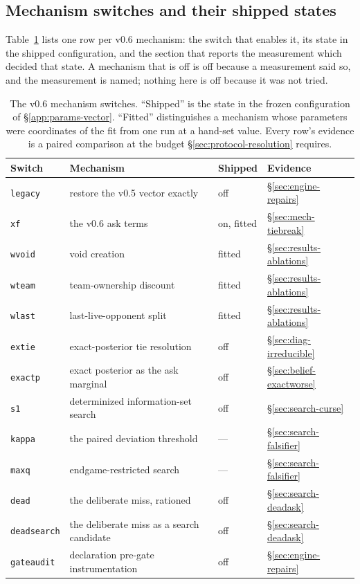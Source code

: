 \subsection{Mechanism switches and their shipped states}
\label{app:params-switches}

Table~\ref{tab:switches} lists one row per v0.6 mechanism: the switch that
enables it, its state in the shipped configuration, and the section that reports
the measurement which decided that state. A mechanism that is off is off because
a measurement said so, and the measurement is named; nothing here is off because
it was not tried.

\begin{table}[ht]
\centering
\caption{The v0.6 mechanism switches. ``Shipped'' is the state in the frozen
configuration of \S\ref{app:params-vector}. ``Fitted'' distinguishes a mechanism
whose parameters were coordinates of the fit from one run at a hand-set value.
Every row's evidence is a paired comparison at the budget
\S\ref{sec:protocol-resolution} requires.}
\label{tab:switches}
\small
\begin{tabular}{llll}
\toprule
Switch & Mechanism & Shipped & Evidence \\
\midrule
\texttt{legacy} & restore the v0.5 vector exactly & off & \S\ref{sec:engine-repairs} \\
\texttt{xf} & the \numVsixAskTerms{} v0.6 ask terms & on, fitted & \S\ref{sec:mech-tiebreak} \\
\texttt{wvoid} & void creation & fitted & \S\ref{sec:results-ablations} \\
\texttt{wteam} & team-ownership discount & fitted & \S\ref{sec:results-ablations} \\
\texttt{wlast} & last-live-opponent split & fitted & \S\ref{sec:results-ablations} \\
\texttt{extie} & exact-posterior tie resolution & off & \S\ref{sec:diag-irreducible} \\
\texttt{exactp} & exact posterior as the ask marginal & off & \S\ref{sec:belief-exactworse} \\
\texttt{s1} & determinized information-set search & off & \S\ref{sec:search-curse} \\
\texttt{kappa} & the paired deviation threshold & --- & \S\ref{sec:search-falsifier} \\
\texttt{maxq} & endgame-restricted search & --- & \S\ref{sec:search-falsifier} \\
\texttt{dead} & the deliberate miss, rationed & off & \S\ref{sec:search-deadask} \\
\texttt{deadsearch} & the deliberate miss as a search candidate & off & \S\ref{sec:search-deadask} \\
\texttt{gateaudit} & declaration pre-gate instrumentation & off & \S\ref{sec:engine-repairs} \\
\bottomrule
\end{tabular}
\end{table}

